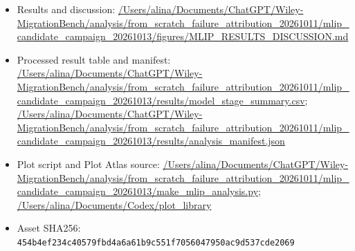 \begin{itemize}[leftmargin=1.4em,noitemsep]
\item Results and discussion: \begingroup\scriptsize\url{/Users/alina/Documents/ChatGPT/Wiley-MigrationBench/analysis/from_scratch_failure_attribution_20261011/mlip_candidate_campaign_20261013/figures/MLIP_RESULTS_DISCUSSION.md}\endgroup
\item Processed result table and manifest: \begingroup\scriptsize\url{/Users/alina/Documents/ChatGPT/Wiley-MigrationBench/analysis/from_scratch_failure_attribution_20261011/mlip_candidate_campaign_20261013/results/model_stage_summary.csv}\endgroup; \url{/Users/alina/Documents/ChatGPT/Wiley-MigrationBench/analysis/from_scratch_failure_attribution_20261011/mlip_candidate_campaign_20261013/results/analysis_manifest.json}
\item Plot script and Plot Atlas source: \begingroup\scriptsize\url{/Users/alina/Documents/ChatGPT/Wiley-MigrationBench/analysis/from_scratch_failure_attribution_20261011/mlip_candidate_campaign_20261013/make_mlip_analysis.py}\endgroup; \url{/Users/alina/Documents/Codex/plot_library}
\item Asset SHA256: \texttt{454b4ef234c40579fbd4a6a61b9c551f7056047950ac9d537cde2069}
\end{itemize}
